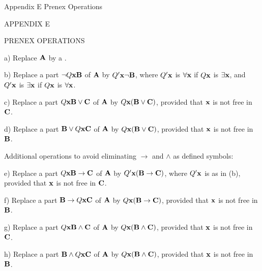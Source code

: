  {Appendix E Prenex Operations}
\centerline{\xmplbxi APPENDIX E}
\medskip
\centerline{\xmplbx PRENEX OPERATIONS}
\bigskip

\item{a)} Replace ${\bf A}$ by a .
\item{b)} Replace a part $\neg Q{\bf x}{\bf B}$ of ${\bf A}$ by $Q'{\bf x}\neg{\bf B}$, where 
$Q'{\bf x}$ is $\forall{\bf x}$ if $Q{\bf x}$ is $\exists{\bf x}$, and $Q'{\bf x}$ is $\exists{\bf x}$
if $Q{\bf x}$ is $\forall{\bf x}$.
\item{c)} Replace a part $Q{\bf x}{\bf B} \lor {\bf C}$ of ${\bf A}$ by $Q{\bf x}({\bf B} \lor {\bf C})$,
provided that ${\bf x}$ is not free in ${\bf C}$.
\item{d)} Replace a part ${\bf B} \lor Q{\bf x}{\bf C}$ of ${\bf A}$ by $Q{\bf x}({\bf B} \lor {\bf C})$,
provided that ${\bf x}$ is not free in ${\bf B}$.

\medskip

Additional operations to avoid eliminating $\to$ and $\land$ as defined symbols: 
\item{e)} Replace a part $Q{\bf x}{\bf B} \to {\bf C}$ of ${\bf A}$ by $Q'{\bf x}({\bf B} \to {\bf C})$,
where $Q'{\bf x}$ is as in (b), provided that ${\bf x}$ is not free in ${\bf C}$.
\item{f)} Replace a part ${\bf B} \to Q{\bf x}{\bf C}$ of ${\bf A}$ by $Q{\bf x}({\bf B} \to {\bf C})$,
provided that ${\bf x}$ is not free in ${\bf B}$.
\item{g)} Replace a part $Q{\bf x}{\bf B} \land {\bf C}$ of ${\bf A}$ by $Q{\bf x}({\bf B} \land {\bf C})$,
provided that ${\bf x}$ is not free in ${\bf C}$.
\item{h)} Replace a part ${\bf B} \land Q{\bf x}{\bf C}$ of ${\bf A}$ by $Q{\bf x}({\bf B} \land {\bf C})$,
provided that ${\bf x}$ is not free in ${\bf B}$.

\vfill
\break
